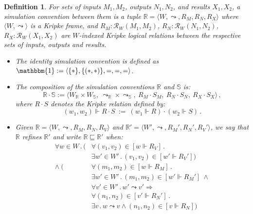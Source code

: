 \documentclass{article}
\newtheorem{definition}{Definition}
\begin{document}
\begin{definition}
For sets of inputs $M_1, M_2$, outputs $N_1, N_2$, and results $X_1, X_2$,
a \emph{simulation convention} between them
is a tuple $\mathbb{R} = \langle W, \leadsto, R_M, R_N, R_X \rangle$
where $\langle W, \leadsto \rangle$ is a Kripke frame, and
$R_M : \mathcal{R}_W(M_1, M_2)$,
$R_N : \mathcal{R}_W(N_1, N_2)$,
$R_X : \mathcal{R}_W(X_1, X_2)$
are $W$-indexed Kripke logical relations
between the respective sets of inputs, outputs and results.
\begin{itemize}
\item
The identity simulation convention is defined as
$\mathbbm{1} := \langle \{*\}, \{(*,*)\}, {=}, {=}, {=} \rangle$.
\item
The composition of
the simulation conventions $\mathbb{R}$ and $\mathbb{S}$ is:
\[
    \mathbb{R} \cdot \mathbb{S} :=
      \langle
        W_\mathbb{R} \times W_\mathbb{S}, \:
        {\leadsto}_\mathbb{R} \times {\leadsto}_\mathbb{S}, \:
        R_M \cdot S_M, \:
        R_N \cdot S_N, \:
        R_X \cdot S_X
      \rangle \,,
\]
where $R \cdot S$ denotes the Kripke relation defined by:
\[
    (w_1, w_2) \Vdash R \cdot S \: := \:
      (w_1 \Vdash R) \cdot (w_2 \Vdash S) \,.
\]
\item
Given
$\mathbb{R} = \langle W, \leadsto, R_M, R_N, R_V \rangle$ and
$\mathbb{R}' = \langle W', \leadsto, R_M', R_N', R_V' \rangle$,
we say that $\mathbb{R}$ \emph{refines} $\mathbb{R}'$
and write $\mathbb{R} \sqsubseteq \mathbb{R}'$
when:
\begin{align*}
  \forall w \in W \,.\, (
    &\forall (v_1, v_2) \in [w \Vdash R_V] \,.\, \\
    &\exists w' \in W' \,.\, (v_1, v_2) \in [w' \Vdash R_V']) \\
  \wedge \: (
    &\forall (m_1, m_2) \in [w \Vdash R_M] \,.\, \\
    &\exists w' \in W' \,.\, (m_1, m_2) \in [w' \Vdash R_M'] \: \wedge \\
    &\forall v' \in W' \,.\, w' \leadsto v' \Rightarrow \\
    &\forall (n_1, n_2) \in [v' \Vdash R_N'] \,.\, \\
    &\exists v \,.\, w \leadsto v \wedge (n_1, n_2) \in [v \Vdash R_N] )
\end{align*}
\end{itemize}
\end{definition}
\end{document}
